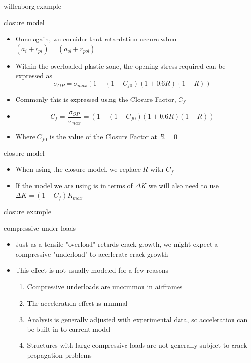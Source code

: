 \documentclass[10pt]{beamer}
\begin{document}
	\begin{frame}{willenborg example}
		
	\end{frame}
	
	\begin{frame}{closure model}
		\begin{itemize}[<+->]
			\item Once again, we consider that retardation occurs when $(a_i + r_{pi}) = (a_{ol} + r_{pol})$
			\item Within the overloaded plastic zone, the opening stress required can be expressed as
			\begin{equation}
			\sigma_{OP} = \sigma_{max} (1-(1-C_{f0})(1+0.6R)(1-R))
			\end{equation}
			\item Commonly this is expressed using the Closure Factor, $C_f$
			\item[] \begin{equation}
			C_f = \frac{\sigma_{OP}}{\sigma_{max}} = (1-(1-C_{f0})(1+0.6R)(1-R))
			\end{equation}
			\item Where $C_{f0}$ is the value of the Closure Factor at $R=0$
		\end{itemize}
	\end{frame}
	
	\begin{frame}{closure model}
		\begin{itemize}[<+->]
			\item When using the closure model, we replace $R$ with $C_f$
			\item If the model we are using is in terms of $\Delta K$ we will also need to use $\Delta K = (1-C_f) K_{max}$
		\end{itemize}
	\end{frame}
	
	\begin{frame}{closure example}
		
	\end{frame}
	
	\begin{frame}{compressive under-loads}
		\begin{itemize}[<+->]
			\item Just as a tensile "overload" retards crack growth, we might expect a compressive "underload" to accelerate crack growth
			\item This effect is not usually modeled for a few reasons
			\begin{enumerate}
				\item Compressive underloads are uncommon in airframes
				\item The acceleration effect is minimal
				\item Analysis is generally adjusted with experimental data, so acceleration can be built in to current model
				\item Structures with large compressive loads are not generally subject to crack propagation problems
			\end{enumerate}
		\end{itemize}
	\end{frame}
\end{document}
